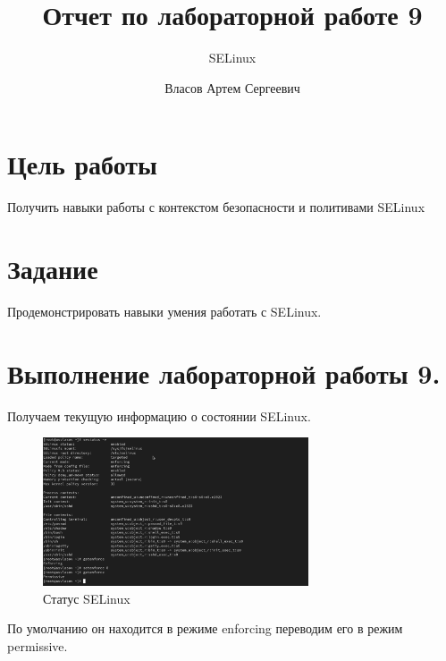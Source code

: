 \documentclass[
  12pt,
  a4paper,
  DIV=11,
  numbers=noendperiod]{scrreprt}
\title{Отчет по лабораторной работе 9}
\subtitle{SELinux}
\author{Власов Артем Сергеевич}
\date{}
\renewcommand*\contentsname{Содержание}
\newcommand\contentsname{Содержание}
\begin{document}
\maketitle

\renewcommand*\contentsname{Содержание}
{
\setcounter{tocdepth}{1}
\tableofcontents
}
\listoffigures
\listoftables
{}
\chapter{Цель
работы}\label{ux446ux435ux43bux44c-ux440ux430ux431ux43eux442ux44b}

Получить навыки работы с контекстом безопасности и политивами SELinux

\chapter{Задание}\label{ux437ux430ux434ux430ux43dux438ux435}

Продемонстрировать навыки умения работать с SELinux.

\chapter{Выполнение лабораторной работы
9.}\label{ux432ux44bux43fux43eux43bux43dux435ux43dux438ux435-ux43bux430ux431ux43eux440ux430ux442ux43eux440ux43dux43eux439-ux440ux430ux431ux43eux442ux44b-9.}

Получаем текущую информацию о состоянии SELinux.

\begin{figure}

{\centering \includegraphics[width=0.7\textwidth,height=\textheight]{image/1.png}

}

\caption{Статус SELinux}

\end{figure}%

По умолчанию он находится в режиме enforcing переводим его в режим
permissive.
\end{document}
